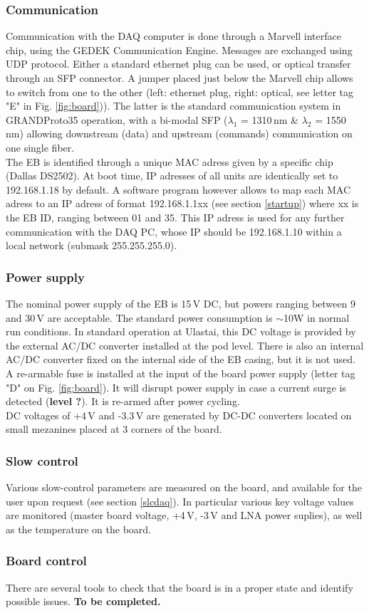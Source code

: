 \subsubsection{Communication}
\label{comms}
Communication with the DAQ computer is done through a Marvell interface chip, using the GEDEK Communication Engine. Messages are exchanged using UDP protocol. Either a standard ethernet plug can be used, or optical transfer through an SFP connector. A jumper placed just below the Marvell chip allows to switch from one to the other (left: ethernet plug, right: optical, see letter tag "E" in Fig. \ref{fig:board})). The latter is the standard communication system in GRANDProto35 operation, with a bi-modal SFP ($\lambda_1$ = 1310\,nm \& $\lambda_2$ = 1550\,nm) allowing downstream (data) and upstream (commands) communication on one single fiber. \\
%
The EB is identified through a unique MAC adress given by a specific chip (Dallas DS2502). At boot time, IP adresses of all units are identically set to 192.168.1.18 by default.  A software program however allows to map each MAC adress to an IP adress of format 192.168.1.1xx (see section \ref{startup}) where xx is the EB ID, ranging between 01 and 35. This IP adress is used for any further communication with the DAQ PC, whose IP should be 192.168.1.10 within a local network (submask 255.255.255.0).


\subsubsection{Power supply}
The nominal power supply of the EB is 15\,V DC, but powers ranging between 9 and 30\,V are acceptable. The standard power consumption is $\sim$10W in normal run conditions. In standard operation at Ulastai, this DC voltage is provided by the external AC/DC converter installed at the pod level. There is also an internal AC/DC converter fixed on the internal side of the EB casing, but it is not used. \\
%
A re-armable fuse is installed at the input of the board power supply (letter tag "D"  on Fig. \ref{fig:board}). It will disrupt power supply in case a current surge is detected ({\bf level ?}). It is re-armed after power cycling. \\
%
DC voltages of +4\,V and -3.3\,V are generated by DC-DC converters located on small mezanines placed at 3 corners of the board.


\subsubsection{Slow control}
\label{slc}
Various slow-control parameters are measured on the board, and available for the user upon request (see section \ref{slcdaq}). In particular various key voltage values are monitored (master board voltage, +4\,V, -3\,V and LNA power suplies), as well as the temperature on the board. 

\subsubsection{Board control}
\label{control}
There are several tools to check that the board is in a proper state and identify possible issues. {\bf To be completed.}

